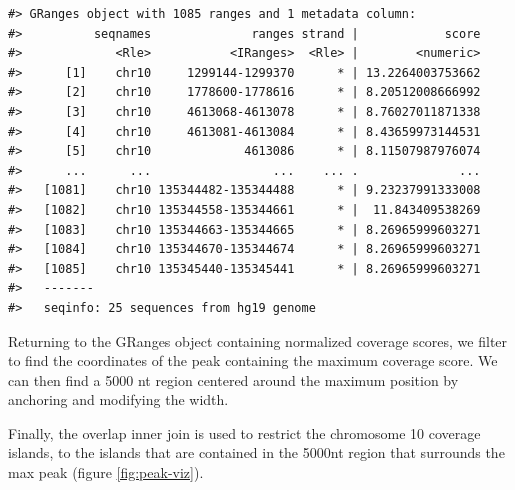 \documentclass[]{article}
\newenvironment{Shaded}{\begin{snugshade}}{\end{snugshade}}
\newcommand{\KeywordTok}[1]{\textcolor[rgb]{0.13,0.29,0.53}{\textbf{#1}}}
\newcommand{\DataTypeTok}[1]{\textcolor[rgb]{0.13,0.29,0.53}{#1}}
\newcommand{\DecValTok}[1]{\textcolor[rgb]{0.00,0.00,0.81}{#1}}
\newcommand{\StringTok}[1]{\textcolor[rgb]{0.31,0.60,0.02}{#1}}
\newcommand{\OperatorTok}[1]{\textcolor[rgb]{0.81,0.36,0.00}{\textbf{#1}}}
\newcommand{\NormalTok}[1]{#1}
\begin{document}
\begin{verbatim}
#> GRanges object with 1085 ranges and 1 metadata column:
#>          seqnames              ranges strand |            score
#>             <Rle>           <IRanges>  <Rle> |        <numeric>
#>      [1]    chr10     1299144-1299370      * | 13.2264003753662
#>      [2]    chr10     1778600-1778616      * | 8.20512008666992
#>      [3]    chr10     4613068-4613078      * | 8.76027011871338
#>      [4]    chr10     4613081-4613084      * | 8.43659973144531
#>      [5]    chr10             4613086      * | 8.11507987976074
#>      ...      ...                 ...    ... .              ...
#>   [1081]    chr10 135344482-135344488      * | 9.23237991333008
#>   [1082]    chr10 135344558-135344661      * |  11.843409538269
#>   [1083]    chr10 135344663-135344665      * | 8.26965999603271
#>   [1084]    chr10 135344670-135344674      * | 8.26965999603271
#>   [1085]    chr10 135345440-135345441      * | 8.26965999603271
#>   -------
#>   seqinfo: 25 sequences from hg19 genome
\end{verbatim}

Returning to the GRanges object containing normalized coverage scores,
we filter to find the coordinates of the peak containing the maximum
coverage score. We can then find a 5000 nt region centered around the
maximum position by anchoring and modifying the width.

\begin{Shaded}
\end{Shaded}

Finally, the overlap inner join is used to restrict the chromosome 10
coverage islands, to the islands that are contained in the 5000nt region
that surrounds the max peak (figure \ref{fig:peak-viz}).

\begin{Shaded}
\end{Shaded}
\end{document}
